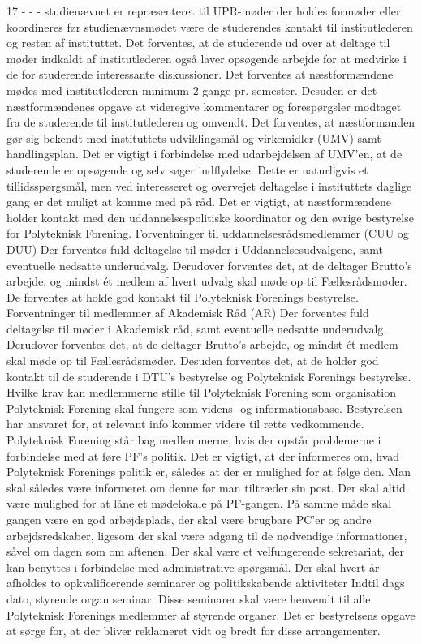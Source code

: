 17
-
-
-
studienævnet er repræsenteret til UPR-møder
der holdes formøder eller koordineres før studienævnsmødet
være de studerendes kontakt til institutlederen og resten af instituttet.
Det forventes, at de studerende ud over at deltage til møder indkaldt af institutlederen også laver opsøgende arbejde for
at medvirke i de for studerende interessante diskussioner. Det forventes at næstformændene mødes med institutlederen
minimum 2 gange pr. semester. Desuden er det næstformændenes opgave at videregive kommentarer og forespørgsler
modtaget fra de studerende til institutlederen og omvendt.
Det forventes, at næstformanden gør sig bekendt med instituttets udviklingsmål og virkemidler (UMV) samt
handlingsplan. Det er vigtigt i forbindelse med udarbejdelsen af UMV’en, at de studerende er opsøgende og selv søger
indflydelse. Dette er naturligvis et tillidsspørgsmål, men ved interesseret og overvejet deltagelse i instituttets daglige
gang er det muligt at komme med på råd.
Det er vigtigt, at næstformændene holder kontakt med den uddannelsespolitiske koordinator og den øvrige bestyrelse
for Polyteknisk Forening.
Forventninger til uddannelsesrådsmedlemmer (CUU og DUU)
Der forventes fuld deltagelse til møder i Uddannelsesudvalgene, samt eventuelle nedsatte underudvalg. Derudover
forventes det, at de deltager Brutto’s arbejde, og mindst ét medlem af hvert udvalg skal møde op til Fællesrådsmøder.
De forventes at holde god kontakt til Polyteknisk Forenings bestyrelse.
Forventninger til medlemmer af Akademisk Råd (AR)
Der forventes fuld deltagelse til møder i Akademisk råd, samt eventuelle nedsatte underudvalg. Derudover forventes
det, at de deltager Brutto’s arbejde, og mindst ét medlem skal møde op til Fællesrådsmøder.
Desuden forventes det, at de holder god kontakt til de studerende i DTU’s bestyrelse og Polyteknisk Forenings
bestyrelse.
Hvilke krav kan medlemmerne stille til Polyteknisk Forening som organisation
Polyteknisk Forening skal fungere som videns- og informationsbase. Bestyrelsen har ansvaret for, at relevant info
kommer videre til rette vedkommende.
Polyteknisk Forening står bag medlemmerne, hvis der opstår problemerne i forbindelse med at føre PF’s politik.
Det er vigtigt, at der informeres om, hvad Polyteknisk Forenings politik er, således at der er mulighed for at følge den.
Man skal således være informeret om denne før man tiltræder sin post.
Der skal altid være mulighed for at låne et mødelokale på PF-gangen. På samme måde skal gangen være en god
arbejdsplads, der skal være brugbare PC'er og andre arbejdsredskaber, ligesom der skal være adgang til de nødvendige
informationer, såvel om dagen som om aftenen.
Der skal være et velfungerende sekretariat, der kan benyttes i forbindelse med administrative spørgsmål.
Der skal hvert år afholdes to opkvalificerende seminarer og politikskabende aktiviteter Indtil dags dato, styrende organ
seminar. Disse seminarer skal være henvendt til alle Polyteknisk Forenings medlemmer af styrende organer. Det er
bestyrelsens opgave at sørge for, at der bliver reklameret vidt og bredt for disse arrangementer.
